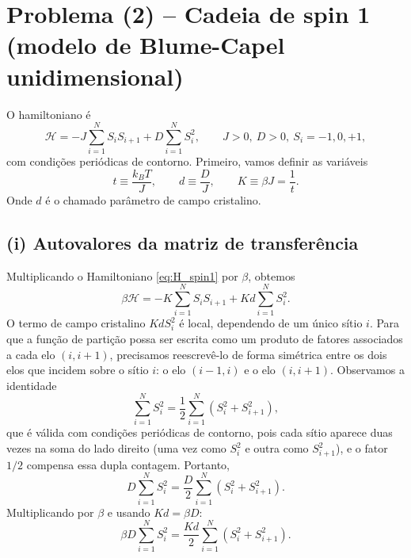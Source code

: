 \documentclass[11pt,a4paper]{article}
\begin{document}
\section*{Problema (2) -- Cadeia de spin 1 (modelo de Blume-Capel unidimensional)}
%
O hamiltoniano é
%
\begin{equation}
    \mathcal H=-J\sum_{i=1}^N S_iS_{i+1}+D\sum_{i=1}^N S_i^2,
    \qquad J>0,\ D>0,\ S_i=-1,0,+1,
    \label{eq:H_spin1}
\end{equation}
%
com condições periódicas de contorno. Primeiro, vamos definir as variáveis
%
\begin{equation}
    t\equiv\frac{k_BT}{J},
    \qquad
    d\equiv\frac{D}{J},
    \qquad
    K\equiv\beta J=\frac1t.
\end{equation}
%
Onde $d$ é o chamado parâmetro de campo cristalino.
%
\subsection*{(i) Autovalores da matriz de transferência}
%
Multiplicando o Hamiltoniano \eqref{eq:H_spin1} por \(\beta\), obtemos
%
\begin{equation}
    \beta \mathcal H = -K \sum_{i=1}^N S_i S_{i+1} + Kd \sum_{i=1}^N S_i^2.
\end{equation}
%
O termo de campo cristalino \(Kd S_i^2\) é local, dependendo de um único sítio \(i\). Para que a função de partição possa ser escrita como um produto de fatores associados a cada elo \((i, i+1)\), precisamos reescrevê-lo de forma simétrica entre os dois elos que incidem sobre o sítio \(i\): o elo \((i-1, i)\) e o elo \((i, i+1)\). 
%
Observamos a identidade
%
\begin{equation}
    \sum_{i=1}^N S_i^2 = \frac{1}{2} \sum_{i=1}^N \left( S_i^2 + S_{i+1}^2 \right),
    \label{eq:identidade}
\end{equation}
%
que é válida com condições periódicas de contorno, pois cada sítio aparece duas vezes na soma do lado direito (uma vez como \(S_i^2\) e outra como \(S_{i+1}^2\)), e o fator \(1/2\) compensa essa dupla contagem. Portanto,
%
\begin{equation}
    D \sum_{i=1}^N S_i^2 = \frac{D}{2} \sum_{i=1}^N \left( S_i^2 + S_{i+1}^2 \right).
\end{equation}
%
Multiplicando por \(\beta\) e usando \(Kd = \beta D\):
%
\begin{equation}
    \beta D \sum_{i=1}^N S_i^2 = \frac{Kd}{2} \sum_{i=1}^N \left( S_i^2 + S_{i+1}^2 \right).
\end{equation}
%
\end{document}
